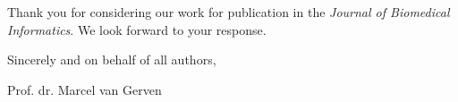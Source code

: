 \documentclass[11pt,a4paper]{article}
\begin{document}
Thank you for considering our work for publication in the \textit{Journal of Biomedical Informatics}. We look forward to your response.

\vspace{2em}

Sincerely and on behalf of all authors,

\vspace{1em}

Prof. dr. Marcel van Gerven
\end{document}
